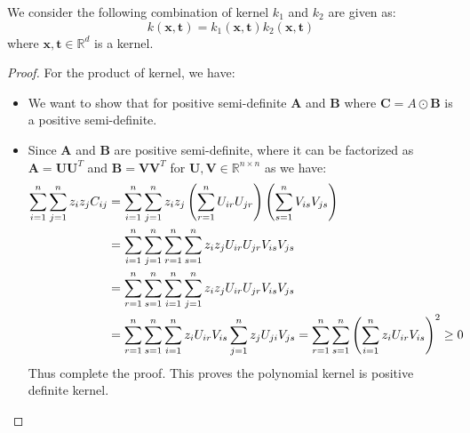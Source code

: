 \begin{proposition}
    We consider the following combination of kernel $k_1$ and $k_2$ are given as:
    \begin{equation*}
        k(\boldsymbol x, \boldsymbol t) = k_1(\boldsymbol x, \boldsymbol t)k_2(\boldsymbol x, \boldsymbol t)
    \end{equation*}
    where $\boldsymbol x, \boldsymbol t \in \mathbb{R}^d$ is a kernel. 
\end{proposition}
\begin{proof}
    For the product of kernel, we have:
    \begin{itemize}
        \item We want to show that for positive semi-definite $\boldsymbol A$ and $\boldsymbol B$ where $\boldsymbol C = A\odot \boldsymbol B$ is a positive semi-definite. 
        \item Since $\boldsymbol A$ and $\boldsymbol B$ are positive semi-definite, where it can be factorized as $\boldsymbol A = \boldsymbol U\boldsymbol U^T$ and $\boldsymbol B = \boldsymbol V\boldsymbol V^T$ for $\boldsymbol U, \boldsymbol V \in \mathbb{R}^{n\times n}$ as we have:
        \begin{equation*}
        \begin{aligned}
            \sum^n_{i=1}\sum^n_{j=1} z_iz_jC_{ij} &= \sum^n_{i=1}\sum_{j=1}^n z_iz_j\left( \sum^n_{r=1} U_{ir}U_{jr} \right)\left( \sum^n_{s=1} V_{is}V_{js} \right) \\
            &= \sum^n_{i=1}\sum_{j=1}^n\sum^n_{r=1}\sum^n_{s=1}z_iz_jU_{ir}U_{jr}V_{is}V_{js} \\
            &= \sum^n_{r=1}\sum^n_{s=1}\sum^n_{i=1}\sum_{j=1}^nz_iz_jU_{ir}U_{jr}V_{is}V_{js} \\
            &= \sum^n_{r=1}\sum^n_{s=1}\sum_{i=1}^nz_iU_{ir}V_{is}\sum^n_{j=1}z_jU_{ji}V_{js} = \sum^n_{r=1}\sum^n_{s=1}\left( \sum_{i=1}^n z_iU_{ir}V_{is} \right)^2 \ge 0
        \end{aligned}
        \end{equation*}
        Thus complete the proof. This proves the polynomial kernel is positive definite kernel. 
    \end{itemize}
\end{proof}

